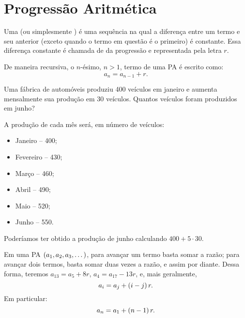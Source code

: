 \section{Progressão Aritmética}

\begin{definition}
Uma  (ou simplesmente ) é uma sequência na qual a diferença entre um termo e seu anterior (exceto
quando o termo em questão é o primeiro) é constante. Essa diferença constante é chamada de  da progressão e representada pela
letra $r$.
\end{definition}

\begin{remark}
De maneira recursiva, o $n$-ésimo, $n>1$, termo de uma PA é escrito
como:
%
\begin{equation*}
a_n = a_{n-1} + r.
\end{equation*}
\end{remark}

\begin{example}
Uma fábrica de automóveis produziu 400 veículos em janeiro e aumenta mensalmente sua produção em 30 veículos. Quantos veículos foram produzidos em junho?
\end{example}

\begin{solution}
A produção de cada mês será, em número de veículos:
%
\begin{itemize}
	\item Janeiro -- 400;
	\item Fevereiro -- 430;
	\item Março -- 460;
	\item Abril -- 490;
	\item Maio -- 520;
	\item Junho -- 550.
\end{itemize}
%
Poderíamos ter obtido a produção de junho calculando $400 + 5 \cdot 30$.
\end{solution}

\begin{remark}
Em uma PA $\left( a_1 , a_2 , a_3 , \dots \right)$, para avançar um termo basta somar a razão; para avançar dois termos, basta somar duas
vezes a razão, e assim por diante. Dessa forma, teremos $a_{13} = a_5 +8r$, $a_4 = a_{17} - 13r$, e, mais geralmente, 
%
\begin{equation*}
a_i = a_j + \left(i-j\right)r.
\end{equation*}
%
Em particular:
%
\begin{equation*}
a_n = a_1 + \left(n-1\right)r.
\end{equation*}
\end{remark}

